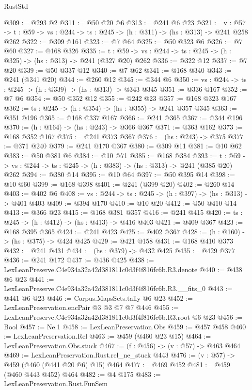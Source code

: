 \begin{lexlean}{RustStd}
\begin{coremodule}
@309 := @293 @2
@311 := @50 @20 @6
@313 := @241 @6 @23
@321 := {v : @57} ->
  {t : @59} -> {vs : @244} -> {ts : @245} -> (h : @311) -> (hs : @313) -> @241 @258 @262
@322 := @309 @161
@323 := @7 @64
@325 := @50 @323 @6
@326 := @7 @60
@327 := @168 @326
@335 := {t : @59} -> {vs : @244} -> {ts : @245} -> (h : @325) -> (hs : @313) -> @241 (@327 @20) @262
@336 := @322 @12
@337 := @7 @20
@339 := @50 @337 @12
@340 := @7 @62
@341 := @168 @340
@343 := @241 (@341 @20)
@344 := @260 @12
@345 := @344 @6
@350 := {vs : @244} -> {ts : @245} -> (h : @339) -> (hs : @313) -> @343 @345
@351 := @336 @167
@352 := @7 @6
@354 := @50 @352 @12
@355 := @242 @23
@357 := @168 @323 @167
@362 := {ts : @245} -> (h : @354) -> (hs : @355) -> @241 @357 @345
@363 := @351 @196
@365 := @168 @337 @167
@366 := @241 @365
@367 := @344 @196
@370 := (h : @164) -> (hs : @243) -> @366 @367
@371 := @363 @162
@373 := @168 @352 @167
@375 := @241 @373 @367
@376 := (hs : @243) -> @375
@377 := @371 @240
@379 := @241 @170 @367
@380 := @309 @11
@381 := @10 @62
@383 := @50 @381 @6
@384 := @10 @71
@385 := @168 @384
@393 := {t : @59} -> {vs : @244} -> {ts : @245} -> (h : @383) -> (hs : @313) -> @241 (@385 @20) @262
@394 := @380 @14
@395 := @10 @64
@397 := @50 @395 @14
@398 := @10 @60
@399 := @168 @398
@401 := @241 (@399 @20)
@402 := @260 @14
@403 := @402 @6
@408 := {vs : @244} -> {ts : @245} -> (h : @397) -> (hs : @313) -> @401 @403
@409 := @394 @170
@410 := @10 @20
@412 := @50 @410 @14
@413 := @366 @23
@415 := @168 @381 @357
@416 := @241 @415
@420 := {ts : @245} -> (h : @412) -> (hs : @413) -> @416 @403
@421 := @409 @367
@423 := @168 @395 @365
@424 := @241 @423
@425 := @402 @367
@428 := (h : @160) -> (hs : @375) -> @424 @425
@429 := @421 @158
@431 := @168 @410 @373
@432 := @241 @431
@434 := (hs : @379) -> @432 @425
@435 := @429 @377
@436 := @241 @172
@437 := @436 @425
@438 := LexLeanPreserve.C4e934a32a42d381811c0d3f4f816fc6b.R3.denote
@440 := @438 @6 @23
@441 := LexLeanPreserve.C4e934a32a42d381811c0d3f4f816fc6b.R3.__fits_0
@443 := @441 @6 @23
@446 := Corpus.MapsSets.tally @6 @23
@452 := LexLeanPreservation.encPair @3 @3 @7 @7 @446
@455 := LexLeanPreserve.C4e934a32a42d381811c0d3f4f816fc6b.R3.root @6 @23
@456 := Bool
@457 := Ne.{1}
@458 := LexLeanPreservation.Obs
@459 := @457 @458
@460 := LexLeanPreservation.Rel
@463 := @459 (@460 @23 @15)
@464 := LexLeanPreservation.Obs.stuck
@467 := (f : @456) -> (v : @57) -> @463 @464
@469 := LexLeanPreservation.Rust.rel_ne_stuck @443
@476 := (v : @57) -> @459 (@460 (@441 @20 @6) @15) @464
@477 := @469 @452
@481 := @459 (@460 @443 @452) @464
@482 := @4 @175
@483 := LexLeanPreservation.Rust.FunSem

\end{coremodule}
\end{lexlean}
